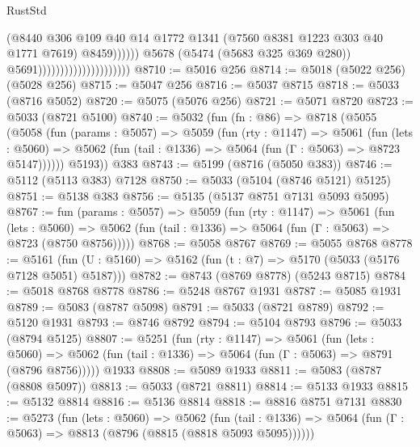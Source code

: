 \begin{lexlean}{RustStd}
\begin{coremodule}
                                                        (@8440
                                                          @306
                                                          @109
                                                          @40
                                                          @14
                                                          @1772
                                                          @1341
                                                          (@7560 @8381 @1223 @303 @40 @1771 @7619)
                                                          @8459))))))
                                              @5678
                                              (@5474 (@5683 @325 @369 @280))
                                              @5691)))))))))))))))))))))
@8710 := @5016 @256
@8714 := @5018 (@5022 @256) (@5028 @256)
@8715 := @5047 @256
@8716 := @5037 @8715
@8718 := @5033 (@8716 @5052)
@8720 := @5075 (@5076 @256)
@8721 := @5071 @8720
@8723 := @5033 (@8721 @5100)
@8740 := @5032
    (fun (fn : @86) =>
    @8718
      (@5055
        (@5058
          (fun (params : @5057) =>
          @5059
            (fun (rty : @1147) =>
            @5061
              (fun (lets : @5060) =>
              @5062 (fun (tail : @1336) => @5064 (fun (Γ : @5063) => @8723 @5147))))))
        @5193))
    @383
@8743 := @5199 (@8716 (@5050 @383))
@8746 := @5112 (@5113 @383) @7128
@8750 := @5033 (@5104 (@8746 @5121) @5125)
@8751 := @5138 @383
@8756 := @5135 (@5137 @8751 @7131 @5093 @5095)
@8767 := fun (params : @5057) =>
  @5059
    (fun (rty : @1147) =>
    @5061
      (fun (lets : @5060) =>
      @5062 (fun (tail : @1336) => @5064 (fun (Γ : @5063) => @8723 (@8750 @8756)))))
@8768 := @5058 @8767
@8769 := @5055 @8768
@8778 := @5161 (fun (U : @5160) => @5162 (fun (t : @7) => @5170 (@5033 (@5176 @7128 @5051) @5187)))
@8782 := @8743 (@8769 @8778) (@5243 @8715)
@8784 := @5018 @8768 @8778
@8786 := @5248 @8767 @1931
@8787 := @5085 @1931
@8789 := @5083 (@8787 @5098)
@8791 := @5033 (@8721 @8789)
@8792 := @5120 @1931
@8793 := @8746 @8792
@8794 := @5104 @8793
@8796 := @5033 (@8794 @5125)
@8807 := @5251
    (fun (rty : @1147) =>
    @5061
      (fun (lets : @5060) =>
      @5062 (fun (tail : @1336) => @5064 (fun (Γ : @5063) => @8791 (@8796 @8756)))))
    @1933
@8808 := @5089 @1933
@8811 := @5083 (@8787 (@8808 @5097))
@8813 := @5033 (@8721 @8811)
@8814 := @5133 @1933
@8815 := @5132 @8814
@8816 := @5136 @8814
@8818 := @8816 @8751 @7131
@8830 := @5273
    (fun (lets : @5060) =>
    @5062
      (fun (tail : @1336) => @5064 (fun (Γ : @5063) => @8813 (@8796 (@8815 (@8818 @5093 @5095))))))

\end{coremodule}
\end{lexlean}
